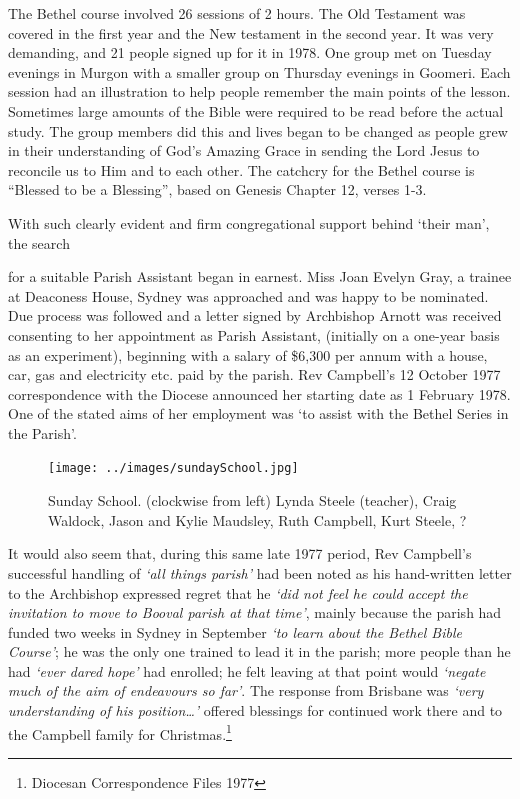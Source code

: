 The Bethel course involved 26 sessions of 2  hours. The Old Testament was covered in the first year and the New testament in the second year. It was very demanding, and 21 people signed up for it in 1978. One group met on Tuesday evenings in Murgon with a smaller group on Thursday evenings in Goomeri. Each session had an illustration to help people remember the main points of the lesson. Sometimes large amounts of the Bible were required to be read before the actual study. The group members did this and lives began to be changed as people grew in their understanding of God's Amazing Grace in sending the Lord Jesus to reconcile us to Him and to each other. The catchcry for the Bethel course is ``Blessed to be a Blessing'', based on Genesis Chapter 12, verses 1-3.



With such clearly evident and firm congregational support behind `their man', the search



for a suitable Parish Assistant began in earnest. Miss Joan Evelyn Gray, a trainee at Deaconess House, Sydney was approached and was happy to be nominated. Due process was followed and a letter signed by Archbishop Arnott was received consenting to her appointment as Parish Assistant, (initially on a one-year basis as an experiment), beginning with a salary of \$6,300 per annum with a house, car, gas and electricity etc. paid by the parish. Rev Campbell's 12 October 1977 correspondence with the Diocese announced her starting date as 1 February 1978. One of the stated aims of her employment was `to assist with the Bethel Series in the Parish'.









\begin{figure}
\begin{center}
\texttt{[image: ../images/sundaySchool.jpg]}
\caption{Sunday School. (clockwise from left) Lynda Steele (teacher), Craig Waldock, Jason and Kylie Maudsley, Ruth Campbell, Kurt Steele, ?}
\end{center}
\end{figure}




It would also seem that, during this same late 1977 period, Rev Campbell's successful handling of \emph{`all things parish'} had been noted as his hand-written letter to the Archbishop expressed regret that he \emph{`did not feel he could accept the invitation to move to Booval parish at that time'}, mainly because the parish had funded two weeks in Sydney in September \emph{`to learn about the Bethel Bible Course'}; he was the only one trained to lead it in the parish; more people than he had \emph{`ever dared hope'} had enrolled; he felt leaving at that point would \emph{`negate much of the aim of endeavours so far'}. The response from Brisbane was \emph{`very understanding of his position\ldots'} offered blessings for continued work there and to the Campbell family for Christmas.\footnote{Diocesan Correspondence Files 1977}


